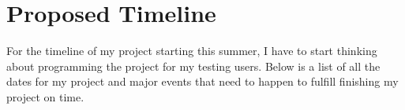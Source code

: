\documentclass[10pt,twocolumn]{article}
\begin{document}
\section{Proposed Timeline}
For the timeline of my project starting this summer, I have to start thinking about programming the project for my testing users. Below is a list of all the dates for my project and major events that need to happen to fulfill finishing my project on time. 



\printbibliography
\end{document}
